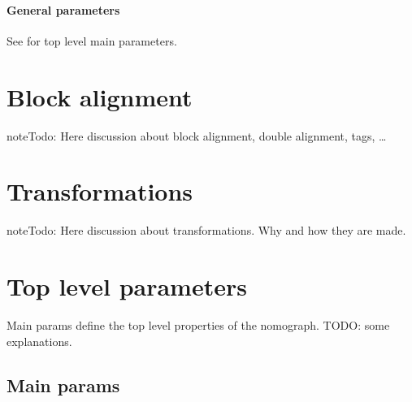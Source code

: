 \documentclass[a4paper,11pt,english]{sphinxmanual}
\begin{document}
\subsubsection{General parameters}
\label{\detokenize{types/types:id51}}
See {\hyperref[\detokenize{main_params:main-params}]{}} for top level main parameters.


\chapter{Block alignment}
\label{\detokenize{alignment/alignment:block-alignment}}\label{\detokenize{alignment/alignment::doc}}
\begin{sphinxadmonition}{note}{\label{alignment/alignment:index-0}Todo:}
Here discussion about block alignment, double alignment, tags, …
\end{sphinxadmonition}


\chapter{Transformations}
\label{\detokenize{transformations/transformations:transformations}}\label{\detokenize{transformations/transformations::doc}}
\begin{sphinxadmonition}{note}{\label{transformations/transformations:index-0}Todo:}
Here discussion about transformations. Why and how they are made.
\end{sphinxadmonition}


\chapter{Top level parameters}
\label{\detokenize{main_params:top-level-parameters}}\label{\detokenize{main_params::doc}}
Main params define the top level properties of the nomograph. TODO: some explanations.


\section{Main params}
\label{\detokenize{main_params:main-params}}\label{\detokenize{main_params:id1}}
\end{document}
